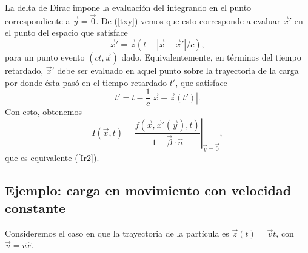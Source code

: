 La delta de Dirac impone la evaluación del integrando en el punto correspondiente a $\vec{y}=\vec{0}$. De (\ref{txy}) vemos que esto corresponde a evaluar $\vec{x}'$ en el punto del espacio que satisface
\begin{equation}
 \vec{x}'=\vec{z}(t-|\vec{x}-\vec{x}'|/c),
\end{equation}
para un punto evento $(ct,\vec{x})$ dado. Equivalentemente, en términos del tiempo retardado, $\vec{x}'$ debe ser evaluado en aquel punto sobre la trayectoria de la carga por donde ésta pasó en el tiempo retardado $t'$, que satisface
\begin{equation}
 t'=t-\frac{1}{c}|\vec{x}-\vec{z}(t')|.
\end{equation}
Con esto, obtenemos
\begin{equation}
 I(\vec{x},t)=\left.\frac{f(\vec{x},\vec{x}'(\vec{y}),t)}{ 1-\vec\beta\cdot\hat{n} } \right|_{\vec{y}=\vec{0}},
\end{equation}
que es equivalente (\ref{Ir2}).

\subsection{Ejemplo: carga en movimiento con velocidad constante}
Consideremos el caso en que la trayectoria de la partícula es $\vec{z}(t)=\vec{v}t$, con $\vec{v}=v\hat{x}$.

